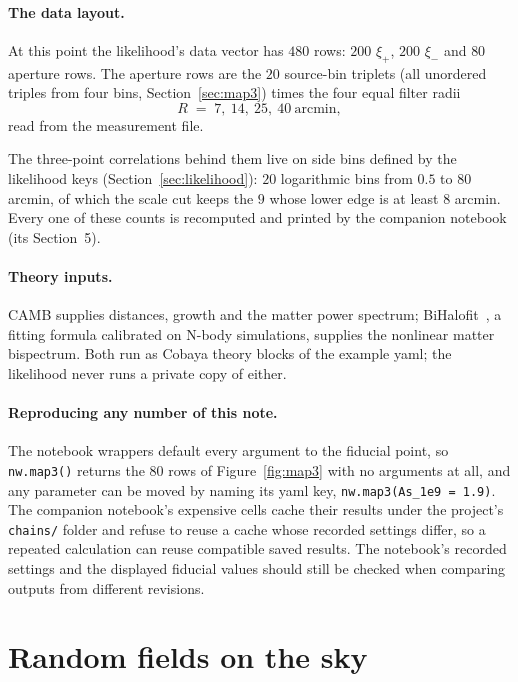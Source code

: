 \documentclass[11pt]{article}
\newcommand{\us}{\_\allowbreak}
\numberwithin{equation}{section}
\begin{document}
\paragraph{The data layout.}
At this point the likelihood's data vector has $480$ rows: $200$
$\xi_+$, $200$ $\xi_-$ and $80$ aperture rows.  The aperture rows are
the $20$ source-bin triplets (all unordered triples from four bins,
Section~\ref{sec:map3}) times the four equal filter radii
\begin{equation}
  R \;=\; 7,\ 14,\ 25,\ 40 \ \text{arcmin},
  \label{eq:radii}
\end{equation}
read from the measurement file.

The three-point correlations behind them live on side bins defined by
the likelihood keys (Section~\ref{sec:likelihood}): $20$ logarithmic
bins from $0.5$ to $80$ arcmin, of which the scale cut keeps the $9$
whose lower edge is at least $8$ arcmin.  Every one of these counts
is recomputed and printed by the companion notebook (its Section~5).

\paragraph{Theory inputs.}
CAMB supplies distances, growth and the matter power spectrum;
BiHalofit~\cite{BiHalofit}, a fitting formula calibrated on N-body
simulations, supplies the nonlinear matter bispectrum.  Both run as
Cobaya theory blocks of the example yaml; the likelihood never runs a
private copy of either.

\paragraph{Reproducing any number of this note.}
The notebook wrappers default every argument to the fiducial point,
so \texttt{nw.map3()} returns the $80$ rows of
Figure~\ref{fig:map3} with no arguments at all, and any parameter
can be moved by naming its yaml key,
\texttt{nw.map3(As\us 1e9 = 1.9)}.  The companion notebook's
expensive cells cache their results under the project's
\texttt{chains/} folder and refuse to reuse a cache whose recorded
settings differ, so a repeated calculation can reuse compatible saved results. The
notebook's recorded settings and the displayed fiducial values should
still be checked when comparing outputs from different revisions.
\section{Random fields on the sky}
\label{sec:fields}
\end{document}
